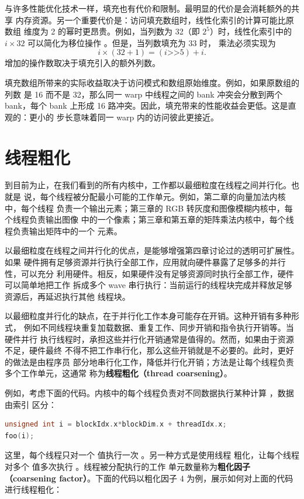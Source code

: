 与许多性能优化技术一样，填充也有代价和限制。最明显的代价是会消耗额外的共享
内存资源。另一个重要代价是：访问填充数组时，线性化索引的计算可能比原数组
维度为 2 的幂时更昂贵。例如，当列数为 32（即 $2^5$）时，线性化索引中的
$i\times32$ 可以简化为移位操作 。但是，当列数填充为 33 时，
乘法必须实现为
\[
  i\times(32+1)=(i\mathbin{\texttt{>>}}5)+i.
\]
增加的操作数取决于填充引入的额外列数。

填充数组所带来的实际收益取决于访问模式和数组原始维度。例如，如果原数组的列数
是 16 而不是 32，那么同一 warp 中线程之间的 bank 冲突会分散到两个 bank，每个
bank 上形成 16 路冲突。因此，填充带来的性能收益会更低。这是直观的：更小的
步长意味着同一 warp 内的访问彼此更接近。

\section{线程粗化}
\label{sec:thread-coarsening}

到目前为止，在我们看到的所有内核中，工作都以最细粒度在线程之间并行化。也就是
说，每个线程被分配最小可能的工作单元。例如，第二章的向量加法内核中，每个线程
负责一个输出元素；第三章的 RGB 转灰度和图像模糊内核中，每个线程负责输出图像
中的一个像素；第三章和第五章的矩阵乘法内核中，每个线程负责输出矩阵中的一个
元素。

以最细粒度在线程之间并行化的优点，是能够增强第四章讨论过的透明可扩展性。如果
硬件拥有足够资源并行执行全部工作，应用就向硬件暴露了足够多的并行性，可以充分
利用硬件。相反，如果硬件没有足够资源同时执行全部工作，硬件可以简单地把工作
拆成多个 wave 串行执行：当前运行的线程块完成并释放足够资源后，再延迟执行其他
线程块。

以最细粒度并行化的缺点，在于并行化工作本身可能存在开销。这种开销有多种形式，
例如不同线程块重复加载数据、重复工作、同步开销和指令执行开销等。当硬件并行
执行线程时，承担这些并行化开销通常是值得的。然而，如果由于资源不足，硬件最终
不得不把工作串行化，那么这些开销就是不必要的。此时，更好的做法是由程序员
部分地串行化工作，降低并行化开销；方法是让每个线程负责多个工作单元，这通常
称为\textbf{线程粗化（thread coarsening）}。

例如，考虑下面的代码。内核中的每个线程负责对不同数据执行某种计算
，数据由索引  区分：

\begin{lstlisting}[language=C++]
unsigned int i = blockIdx.x*blockDim.x + threadIdx.x;
foo(i);
\end{lstlisting}

这里，每个线程只对一个  值执行一次 。另一种方式是使用线程
粗化，让每个线程对多个  值多次执行 。线程被分配执行的工作
单元数量称为\textbf{粗化因子（coarsening factor）}。下面的代码以粗化因子 4
为例，展示如何对上面的代码进行线程粗化：

